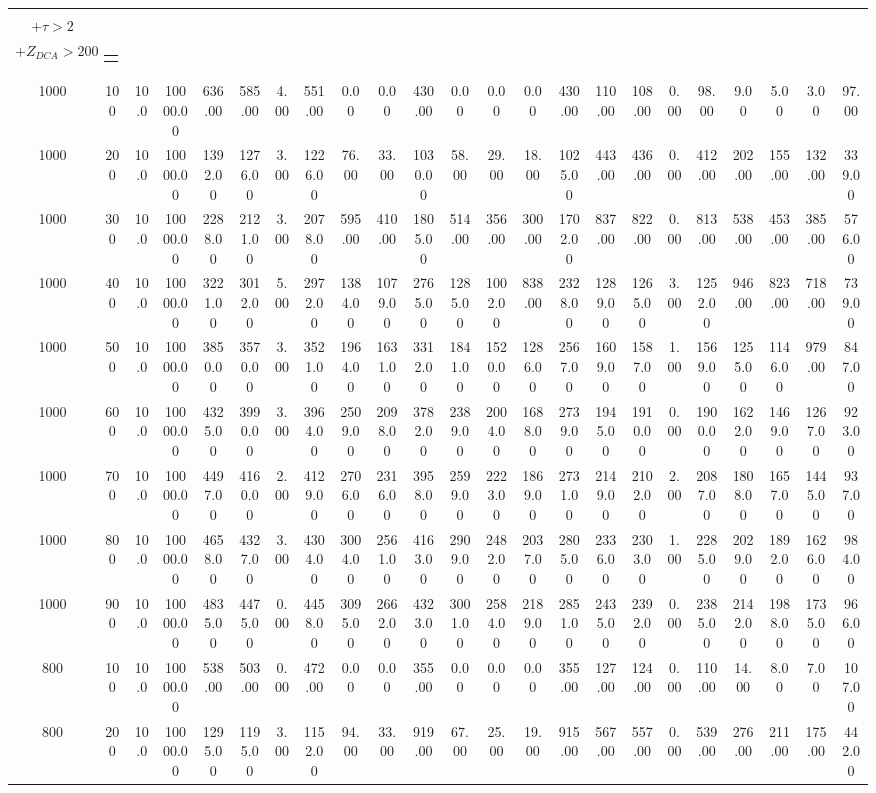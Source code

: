 \documentclass[8pt]{extarticle}
\begin{document}
\begin{longtable}{|c|c|c|c|c|c|c|c|c|c|c|c|c|c|c|c|c|c|c|c|c|c|c|}
\begin{tabular}{@{}c@{}} $E_T^{miss} > 75$ \\ $+ \tau > 2$ \\ $+Z_{DCA} > 200$\end{tabular} & \begin{tabular}{@{}c@{}} $E_{T}^{miss} > 75$ $+ \tau < 4$ \end{tabular} \\ 
\hline 
1000&100&10.0&10000.00&636.00&585.00&4.00&551.00&0.00&0.00&430.00&0.00&0.00&0.00&430.00&110.00&108.00&0.00&98.00&9.00&5.00&3.00&97.00\\ 
\hline 
1000&200&10.0&10000.00&1392.00&1276.00&3.00&1226.00&76.00&33.00&1030.00&58.00&29.00&18.00&1025.00&443.00&436.00&0.00&412.00&202.00&155.00&132.00&339.00\\ 
\hline 
1000&300&10.0&10000.00&2288.00&2121.00&3.00&2078.00&595.00&410.00&1805.00&514.00&356.00&300.00&1702.00&837.00&822.00&0.00&813.00&538.00&453.00&385.00&576.00\\ 
\hline 
1000&400&10.0&10000.00&3221.00&3012.00&5.00&2972.00&1384.00&1079.00&2765.00&1285.00&1002.00&838.00&2328.00&1289.00&1265.00&3.00&1252.00&946.00&823.00&718.00&739.00\\ 
\hline 
1000&500&10.0&10000.00&3850.00&3570.00&3.00&3521.00&1964.00&1631.00&3312.00&1841.00&1520.00&1286.00&2567.00&1609.00&1587.00&1.00&1569.00&1255.00&1146.00&979.00&847.00\\ 
\hline 
1000&600&10.0&10000.00&4325.00&3990.00&3.00&3964.00&2509.00&2098.00&3782.00&2389.00&2004.00&1688.00&2739.00&1945.00&1910.00&0.00&1900.00&1622.00&1469.00&1267.00&923.00\\ 
\hline 
1000&700&10.0&10000.00&4497.00&4160.00&2.00&4129.00&2706.00&2316.00&3958.00&2599.00&2223.00&1869.00&2731.00&2149.00&2102.00&2.00&2087.00&1808.00&1657.00&1445.00&937.00\\ 
\hline 
1000&800&10.0&10000.00&4658.00&4327.00&3.00&4304.00&3004.00&2561.00&4163.00&2909.00&2482.00&2037.00&2805.00&2336.00&2303.00&1.00&2285.00&2029.00&1892.00&1626.00&984.00\\ 
\hline 
1000&900&10.0&10000.00&4835.00&4475.00&0.00&4458.00&3095.00&2662.00&4323.00&3001.00&2584.00&2189.00&2851.00&2435.00&2392.00&0.00&2385.00&2142.00&1988.00&1735.00&966.00\\ 
\hline 
800&100&10.0&10000.00&538.00&503.00&0.00&472.00&0.00&0.00&355.00&0.00&0.00&0.00&355.00&127.00&124.00&0.00&110.00&14.00&8.00&7.00&107.00\\ 
\hline 
800&200&10.0&10000.00&1295.00&1195.00&3.00&1152.00&94.00&33.00&919.00&67.00&25.00&19.00&915.00&567.00&557.00&0.00&539.00&276.00&211.00&175.00&442.00\\ 

\end{longtable}
\end{document}
